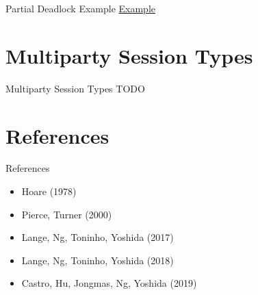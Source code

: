 \documentclass[bigger]{beamer}
\begin{document}
\begin{frame}[label={sec:org4c9a9c2}]{Partial Deadlock Example}
\href{https://github.com/bfbonatto/concurrency-presentation/blob/master/partial-deadlock.go}{Example}
\end{frame}

\section{Multiparty Session Types}
\label{sec:orge7938df}

\begin{frame}[label={sec:org6456fce}]{Multiparty Session Types}
TODO
\end{frame}

\section{References}
\label{sec:orge5100f7}

\begin{frame}[label={sec:orgb4ef151}]{References}
\begin{itemize}
\item Hoare (1978)
\item Pierce, Turner (2000)
\item Lange, Ng, Toninho, Yoshida (2017)
\item Lange, Ng, Toninho, Yoshida (2018)
\item Castro, Hu, Jongmas, Ng, Yoshida (2019)
\end{itemize}
\end{frame}
\end{document}
